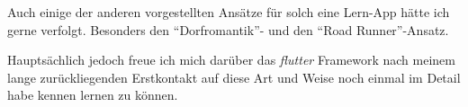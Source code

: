 Auch einige der anderen vorgestellten Ansätze für solch eine Lern-App hätte ich gerne verfolgt.
Besonders den \enquote{Dorfromantik}- und den \enquote{Road Runner}-Ansatz.

Hauptsächlich jedoch freue ich mich darüber das \emph{flutter} Framework nach meinem lange zurückliegenden Erstkontakt auf diese Art und Weise noch einmal im Detail habe kennen lernen zu können.
